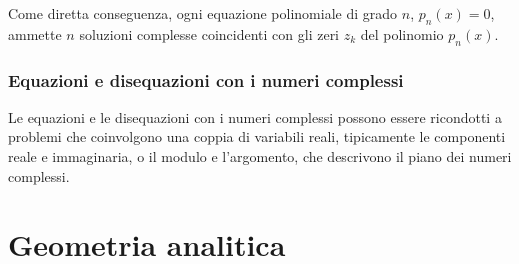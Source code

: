 \documentclass[letterpaper,10pt,italian]{jupyterBook}
\begin{document}
\sphinxAtStartPar
Come diretta conseguenza, ogni equazione polinomiale di grado \(n\), \(p_n(x) = 0\), ammette \(n\) soluzioni complesse coincidenti con gli zeri \(z_k\) del polinomio \(p_n(x)\).


\section{Equazioni e disequazioni con i numeri complessi}
\label{\detokenize{ch/algebra/complex-algebra:equazioni-e-disequazioni-con-i-numeri-complessi}}
\sphinxAtStartPar
Le equazioni e le disequazioni con i numeri complessi possono essere ricondotti a problemi che coinvolgono una coppia di variabili reali, tipicamente le componenti reale e immaginaria, o il modulo e l’argomento, che descrivono il piano dei numeri complessi.

\sphinxAtStartPar
{}

\sphinxstepscope


\part{Geometria analitica}

\sphinxstepscope
\end{document}
